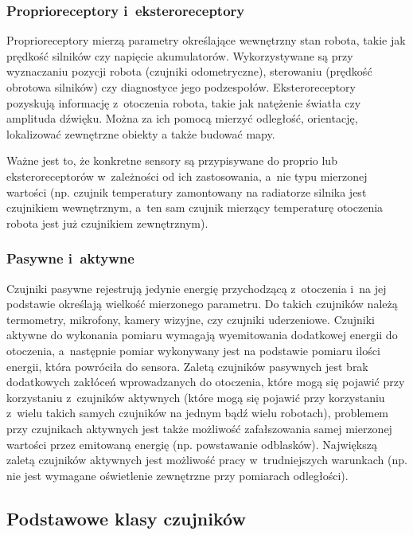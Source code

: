\subsubsection{Proprioreceptory i~eksteroreceptory}

Proprioreceptory mierzą parametry określające wewnętrzny stan
robota, takie jak prędkość silników czy napięcie akumulatorów. Wykorzystywane są
przy wyznaczaniu pozycji robota (czujniki odometryczne), sterowaniu (prędkość
obrotowa silników) czy diagnostyce jego podzespołów. Eksteroreceptory
pozyskują informację z~otoczenia robota, takie jak natężenie
światła czy amplituda dźwięku. Można za ich pomocą mierzyć odległość,
orientację, lokalizować zewnętrzne obiekty a także budować mapy.

Ważne jest to, że konkretne sensory są przypisywane do proprio lub
eksteroreceptorów w~zależności od ich zastosowania, a~nie typu mierzonej
wartości (np. czujnik temperatury zamontowany na radiatorze silnika jest
czujnikiem wewnętrznym, a~ten sam czujnik mierzący temperaturę otoczenia robota
jest już czujnikiem zewnętrznym).

\subsubsection{Pasywne i~aktywne}

Czujniki pasywne rejestrują jedynie energię przychodzącą z~otoczenia i~na
jej podstawie określają wielkość mierzonego parametru. Do takich czujników
należą termometry, mikrofony, kamery wizyjne, czy czujniki uderzeniowe.
Czujniki aktywne do wykonania pomiaru wymagają wyemitowania dodatkowej energii
do otoczenia, a~następnie pomiar wykonywany jest na podstawie pomiaru ilości
energii, która powróciła do sensora. Zaletą czujników pasywnych jest brak
dodatkowych zakłóceń wprowadzanych do otoczenia, które mogą się pojawić
przy korzystaniu z~czujników aktywnych (które mogą się pojawić przy korzystaniu
z~wielu takich samych czujników na jednym bądź wielu robotach), problemem
przy czujnikach aktywnych jest także możliwość zafałszowania samej mierzonej
wartości przez emitowaną energię (np. powstawanie odblasków). Największą zaletą
czujników aktywnych jest możliwość pracy w~trudniejszych warunkach (np. nie
jest wymagane oświetlenie zewnętrzne przy pomiarach odległości).

\subsection{Podstawowe klasy czujników}

